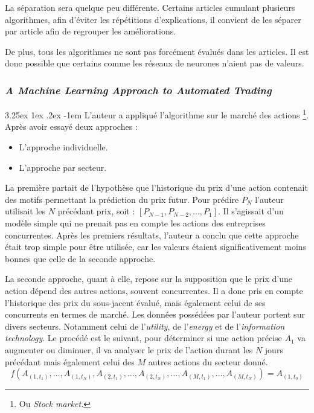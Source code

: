 \documentclass[a4paper, 11pt]{article}
\makeatletter
\newcounter{subsubsubsection}[subsubsection]
\renewcommand\paragraph{\@startsection{paragraph}{5}{\z@}%
  {3.25ex \@plus1ex \@minus.2ex}%
  {-1em}%
  {\normalfont\normalsize\bfseries}}
\makeatother
\begin{document}
La séparation sera quelque peu différente. Certains articles cumulant plusieurs algorithmes, afin d'éviter
les répétitions d'explications, il convient de les séparer par article afin de regrouper les améliorations.

De plus, tous les algorithmes ne sont pas forcément évalués dans les articles. Il est donc possible que certains
comme les réseaux de neurones n'aient pas de valeurs.

\subsubsection{\textit{A Machine Learning Approach to Automated Trading}}

\paragraph{}
L'auteur \cite{machine_learning_automated_trading} a appliqué l'algorithme sur le marché des actions
\footnote{Ou \textit{Stock market.}}. Après avoir essayé deux approches :
\begin{itemize}
\item L'approche individuelle.
\item L'approche par secteur.
\end{itemize}

La première partait de l'hypothèse que l'historique du prix d'une action contenait des motifs permettant la prédiction
du prix futur. Pour prédire $P_N$ l'auteur utilisait les $N$ précédant prix, soit : $[P_{N-1}, P_{N-2},...,P_1]$. Il s'agissait d'un modèle simple qui ne prenait pas en compte les actions des entreprises concurrentes.
Après les premiers résultats, l'auteur a conclu que cette approche
était trop simple pour être utilisée, car les valeurs étaient significativement moins bonnes que celle de la
seconde approche\cite{machine_learning_automated_trading}.

La seconde approche, quant à elle, repose sur la supposition que le prix d'une action dépend des autres actions,
souvent concurrentes. Il a donc pris en compte l'historique des prix du sous-jacent évalué, mais également celui de ses
concurrents en termes de marché. Les données possédées par l'auteur portent sur divers secteurs. Notamment celui
de l'\textit{utility}, de l'\textit{energy} et de l'\textit{information technology}. Le procédé est le suivant,
pour déterminer si une action précise $A_1$ va augmenter ou diminuer, il va analyser le prix de l'action durant les $N$ jours
précédant mais également celui des $M$ autres actions du secteur donné.
$$f(A_{(1,t_1)},\dots, A_{(1,t_N)}, A_{(2,t_1)}, \dots, A_{(2,t_N)}, \dots, A_{(M,t_1)},\dots,A_{(M,t_N)}) = A_{(1,t_0)}$$
\end{document}
